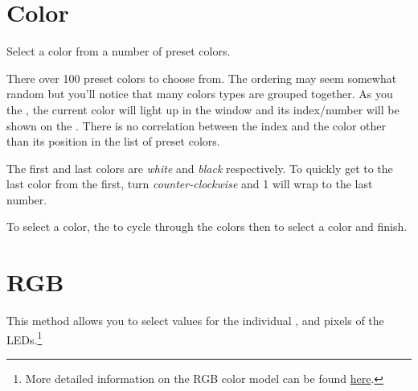 \section{Color} 

Select a color from a number of preset colors.

\par\medskip

There over \num{100} preset colors to choose from.  The ordering may seem
somewhat random but you'll notice that many colors types are grouped
together.  As you  the , the current color will light up 
in the  window and its index\slash number will be shown on the .
There is no correlation between the index and the color other than its
position in the list of preset colors.

\par\medskip

The first and last colors are \textit{white} and \textit{black} respectively.
To quickly get to the last color from the first, turn \textit{counter-clockwise}
and \num{1} will wrap to the last number.

\par\medskip

To select a color,  the  to cycle through the colors then
 to select a color and finish.


\section{RGB} 

This method allows you to select values for the individual , 
and  pixels of the LEDs.\footnote{ More detailed information on the RGB
color model can be found
\href{https://en.wikipedia.org/wiki/RGB\_color\_model}{here}.}

\par\medskip

